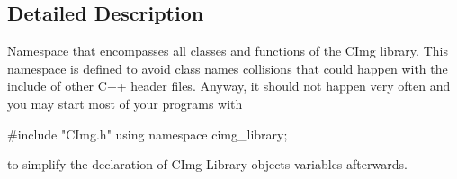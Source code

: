 \subsection{Detailed Description}
Namespace that encompasses all classes and functions of the CImg library. This namespace is defined to avoid class names collisions that could happen with the include of other C++ header files. Anyway, it should not happen very often and you may start most of your programs with 
\begin{DoxyCode}
   #include "CImg.h"
   using namespace cimg_library;
\end{DoxyCode}
 to simplify the declaration of CImg Library objects variables afterwards. 